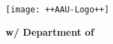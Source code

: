 
\cleardoublepage
{}
{}
\thispagestyle{empty}
%
%
\begin{minipage}[t]{0.48\textwidth}
	\vspace*{-25pt}
	\texttt{[image: ++AAU-Logo++]}
\end{minipage}
\hfill %
\begin{minipage}[t]{0.48\textwidth}{
	\small 
	\textbf{w/ Department of\\
	\institutionname}\\
	\studyname\\
	\adress\\
	\city\\
}
\end{minipage}
\vspace*{1cm}
